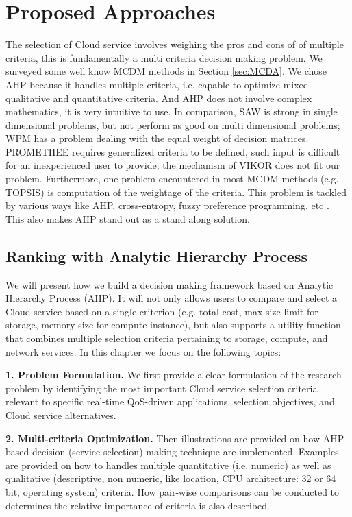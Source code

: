\section{Proposed Approaches}
The selection of Cloud service involves weighing the pros and cons of
of multiple criteria,
this is fundamentally a multi criteria decision making problem.
We surveyed some well know MCDM methods in Section \ref{sec:MCDA}.
We chose AHP because it handles multiple criteria,
i.e. capable to optimize mixed qualitative and quantitative criteria.
And AHP does not involve complex mathematics, it is very intuitive to use.
In comparison, SAW is strong in single dimensional problems, but not perform as 
good on multi dimensional problems; WPM has a problem dealing with the equal weight of decision matrices. PROMETHEE requires generalized criteria to be defined, such input is difficult for an inexperienced user to provide; the mechanism of VIKOR does not fit our problem. 
Furthermore, one problem encountered in most MCDM methods (e.g. TOPSIS) is computation of the weightage of the criteria. This problem is tackled by various ways like AHP, cross-entropy, fuzzy preference programming, etc \cite{AHPvsTOPSIS}.
This also makes AHP stand out as a stand along solution.

\subsection{Ranking with Analytic Hierarchy Process}
\label{sec:RankingWithAnalyticHierarchyProcess}
We will present how we build a decision making framework based on Analytic Hierarchy Process (AHP).
It will not only allows users to compare and select a Cloud service based on a single criterion (e.g. total cost, max size limit for storage, memory size for compute instance), but also supports a utility function that combines multiple selection criteria pertaining to storage, compute, and network services.
In this chapter we focus on the following topics:

\textbf{1. Problem Formulation.} We first provide a clear formulation of the research problem by identifying the most important Cloud service selection criteria relevant to specific real-time QoS-driven applications, selection objectives, and Cloud service alternatives.

\textbf{2. Multi-criteria Optimization.} Then illustrations are provided on how AHP based decision (service selection) making technique are implemented. Examples are provided on how to handles multiple quantitative (i.e. numeric) as well as qualitative (descriptive, non numeric, like location, CPU architecture: 32 or 64 bit, operating system) criteria. How pair-wise comparisons can be conducted to determines the relative importance of criteria is also described.


